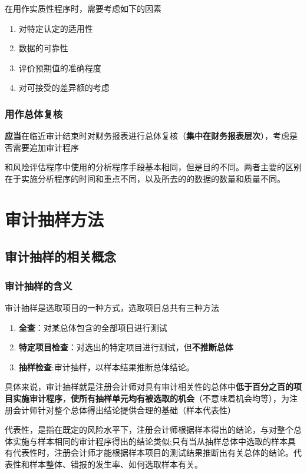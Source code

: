 \documentclass[UTF8,12pt]{ctexart}
\numberwithin{equation}{section} %
\numberwithin{figure}{section}
\numberwithin{table}{section}
\begin{document}
	在用作实质性程序时，需要考虑如下的因素
	\begin{enumerate}
		\item 对特定认定的适用性
		
		\item 数据的可靠性
		
		\item 评价预期值的准确程度
		
		\item 对可接受的差异额的考虑
	\end{enumerate}
	
	
	\subsubsection{用作总体复核}
	\textbf{应当}在临近审计结束时对财务报表进行总体复核（\textbf{集中在财务报表层次}），考虑是否需要追加审计程序
	
	和风险评估程序中使用的分析程序手段基本相同，但是目的不同。两者主要的区别在于实施分析程序的时间和重点不同，以及所去的的数据的数量和质量不同。
	
	\newpage
	\section{审计抽样方法}
	\subsection{审计抽样的相关概念}
	\subsubsection{审计抽样的含义}
	审计抽样是选取项目的一种方式，选取项目总共有三种方法
	\begin{enumerate}
		\item \textbf{全查}：对某总体包含的全部项目进行测试
		
		\item \textbf{特定项目检查}：对选出的特定项目进行测试，但\textbf{不推断总体}
		
		\item \textbf{抽样检查}:审计抽样，以样本结果推断总体结论。
	\end{enumerate}
	
	具体来说，审计抽样就是注册会计师对具有审计相关性的总体中\textbf{低于百分之百的项目实施审计程序}，\textbf{使所有抽样单元均有被选取的机会}（不意味着机会均等），为注册会计师针对整个总体得出结论提供合理的基础（样本代表性）
	
	代表性，是指在既定的风险水平下，注册会计师根据样本得出的结论，与对整个总体实施与样本相同的审计程序得出的结论类似;只有当从抽样总体中选取的样本具有代表性时，注册会计师才能根据样本项目的测试结果推断出有关总体的结论。代表性和样本整体、错报的发生率、如何选取样本有关。
	
\end{document}
